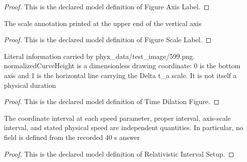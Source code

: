 \begin{proof}
  This is the declared model definition of Figure Axis Label.
\end{proof}
\begin{definition}
  \label{def:physics:phyx-mini-0599:phyxminiproblems-problemphyxmini0599-figurescalelabel}
  The scale annotation printed at the upper end of the vertical axis
\end{definition}
\begin{proof}
  This is the declared model definition of Figure Scale Label.
\end{proof}
\begin{definition}
  \label{def:physics:phyx-mini-0599:phyxminiproblems-problemphyxmini0599-timedilationfigure}
  Literal information carried by phyx\_data/test\_image/599.png. normalizedCurveHeight is a dimensionless drawing coordinate: 0 is the bottom axis and 1 is the horizontal line carrying the Delta t\_a scale. It is not itself a physical duration
\end{definition}
\begin{proof}
  This is the declared model definition of Time Dilation Figure.
\end{proof}
\begin{definition}
  \label{def:physics:phyx-mini-0599:phyxminiproblems-problemphyxmini0599-relativisticintervalsetup}
  The coordinate interval at each speed parameter, proper interval, axis-scale interval, and stated physical speed are independent quantities. In particular, no field is defined from the recorded 40 s answer
\end{definition}
\begin{proof}
  This is the declared model definition of Relativistic Interval Setup.
\end{proof}
